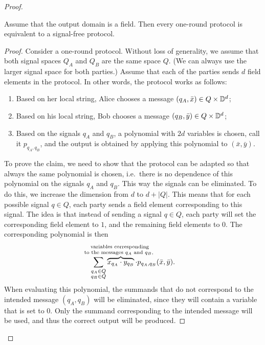 \begin{proof}
 \begin{claim}
    \label{claim:trivial-messages}
    Assume that the output domain is a field. Then every one-round protocol is equivalent to a signal-free  protocol.
 \end{claim}
 \begin{proof} 
    Consider a one-round protocol. Without loss of generality, we assume that both signal spaces $Q_A$ and $Q_B$ are the same space $Q$. (We can always use the larger signal space for both parties.) Assume that each of the parties sends $d$ field elements in the protocol. In other words, the protocol works as follows:
    \begin{enumerate}
        \item Based on her local string, Alice chooses a message $(q_A,\bar x) \in Q \times \mathbb D^d$;
        \item Based on his local string, Bob chooses a message $(q_B,\bar y) \in Q \times \mathbb D^d$;
        \item Based on the signals $q_A$ and $q_B$, a polynomial  with $2d$ variables is chosen, call it $p_{q_A,q_B}$, and the output is obtained by applying this polynomial to $(\bar x, \bar y).$
    \end{enumerate}
    To prove the claim, we need to show that the protocol can be adapted so that always the same polynomial is chosen, i.e.~there is no dependence of this polynomial on the signals $q_A$ and $q_B$. This way the signals can be eliminated. To do this, we increase the dimension from $d$ to $d + |Q|$. 
    This means that for each possible signal $q \in Q$, each party sends a field element corresponding to this signal. The idea is that instead of sending a signal $q \in Q$, each party will set the corresponding field element to $1$, and the remaining field elements to $0$. The corresponding polynomial is then 
    \begin{align*}
    \sum_{\substack{q_A \in Q \\ q_B \in Q}} \myoverbrace{x_{q_A} \cdot y_{q_B}}{variables corresponding \\ to the messages $q_A$ and $q_B$, } \cdot p_{q_A,q_B}(\bar x, \bar y).
    \end{align*}
    When evaluating this polynomial, the summands that do not correspond to the intended message $(q_A,q_B)$ will be eliminated, since they will contain a variable that is set to $0$. Only the summand corresponding to the intended message will be used, and thus the correct output will be produced. 
 \end{proof}


\end{proof}
